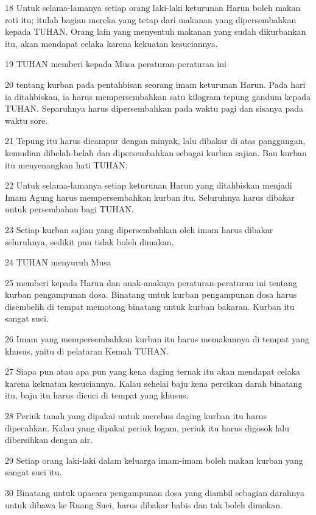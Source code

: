 \par 18 Untuk selama-lamanya setiap orang laki-laki keturunan Harun boleh makan roti itu; itulah bagian mereka yang tetap dari makanan yang dipersembahkan kepada TUHAN. Orang lain yang menyentuh makanan yang sudah dikurbankan itu, akan mendapat celaka karena kekuatan kesuciannya.
\par 19 TUHAN memberi kepada Musa peraturan-peraturan ini
\par 20 tentang kurban pada pentahbisan seorang imam keturunan Harun. Pada hari ia ditahbiskan, ia harus mempersembahkan satu kilogram tepung gandum kepada TUHAN. Separuhnya harus dipersembahkan pada waktu pagi dan sisanya pada waktu sore.
\par 21 Tepung itu harus dicampur dengan minyak, lalu dibakar di atas panggangan, kemudian dibelah-belah dan dipersembahkan sebagai kurban sajian. Bau kurban itu menyenangkan hati TUHAN.
\par 22 Untuk selama-lamanya setiap keturunan Harun yang ditahbiskan menjadi Imam Agung harus mempersembahkan kurban itu. Seluruhnya harus dibakar untuk persembahan bagi TUHAN.
\par 23 Setiap kurban sajian yang dipersembahkan oleh imam harus dibakar seluruhnya, sedikit pun tidak boleh dimakan.
\par 24 TUHAN menyuruh Musa
\par 25 memberi kepada Harun dan anak-anaknya peraturan-peraturan ini tentang kurban pengampunan dosa. Binatang untuk kurban pengampunan dosa harus disembelih di tempat memotong binatang untuk kurban bakaran. Kurban itu sangat suci.
\par 26 Imam yang mempersembahkan kurban itu harus memakannya di tempat yang khusus, yaitu di pelataran Kemah TUHAN.
\par 27 Siapa pun atau apa pun yang kena daging ternak itu akan mendapat celaka karena kekuatan kesuciannya. Kalau sehelai baju kena percikan darah binatang itu, baju itu harus dicuci di tempat yang khusus.
\par 28 Periuk tanah yang dipakai untuk merebus daging kurban itu harus dipecahkan. Kalau yang dipakai periuk logam, periuk itu harus digosok lalu dibersihkan dengan air.
\par 29 Setiap orang laki-laki dalam keluarga imam-imam boleh makan kurban yang sangat suci itu.
\par 30 Binatang untuk upacara pengampunan dosa yang diambil sebagian darahnya untuk dibawa ke Ruang Suci, harus dibakar habis dan tak boleh dimakan.

